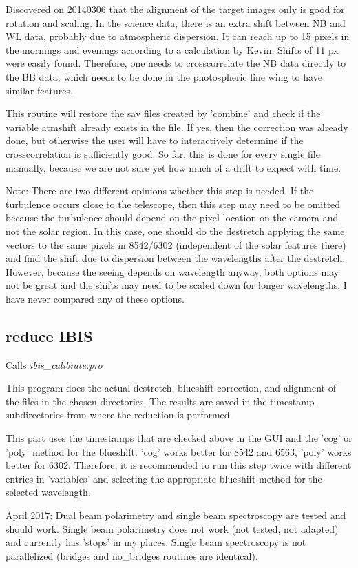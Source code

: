 \documentclass[a4paper,12pt]{article}
\begin{document}
Discovered on 20140306 that the alignment of the target images only is good for rotation and scaling. In the science data, there is an extra shift between NB and WL data, probably due to atmospheric dispersion. It can reach up to 15 pixels in the mornings and evenings according to a calculation by Kevin. Shifts of 11 px were easily found. Therefore, one needs to crosscorrelate the NB data directly to the BB data, which needs to be done in the photospheric line wing to have similar features. 

This routine will restore the sav files created by 'combine' and check if the variable atmshift already exists in the file. If yes, then the correction was already done, but otherwise the user will have to interactively determine if the crosscorrelation is sufficiently good. So far, this is done for every single file manually, because we are not sure yet how much of a drift to expect with time.

Note: There are two different opinions whether this step is needed. If the turbulence occurs close to the telescope, then this step may need to be omitted because the turbulence should depend on the pixel location on the camera and not the solar region. In this case, one should do the destretch applying the same vectors to the same pixels in 8542/6302 (independent of the solar features there) and find the shift due to dispersion between the wavelengths after the destretch. However, because the seeing depends on wavelength anyway, both options may not be great and the shifts may need to be scaled down for longer wavelengths. I have never compared any of these options.


\subsection{reduce IBIS}
Calls \textit{ibis\_calibrate.pro}

This program does the actual destretch, blueshift correction, and
alignment of the files in the chosen directories. The results are
saved in the timestamp-subdirectories from where the reduction is performed.

This part uses the timestamps that are checked above in the GUI and the 'cog' or 'poly' method for the blueshift. 'cog' works better for 8542 and 6563, 'poly' works better for 6302. Therefore, it is recommended to run this step twice with different entries in 'variables' and selecting the appropriate blueshift method for the selected wavelength.

April 2017: Dual beam polarimetry and single beam spectroscopy are tested and should work. Single beam polarimetry does not work (not tested, not adapted) and currently has 'stops' in my places. Single beam spectroscopy is not parallelized (bridges and no\_bridges routines are identical).
\end{document}
